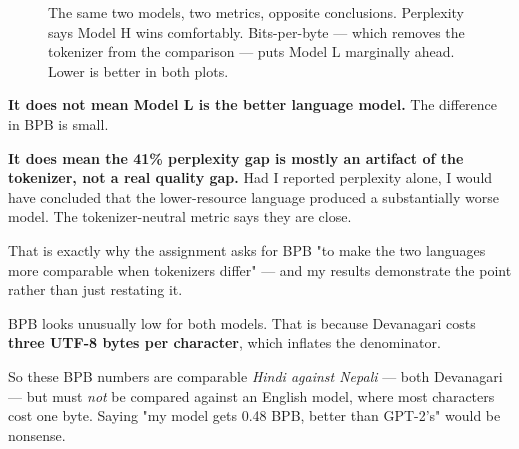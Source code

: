 \documentclass[11pt]{report}
\begin{document}
\begin{figure}[htbp]
\centering
{}
\caption{The same two models, two metrics, opposite conclusions. Perplexity says
Model H wins comfortably. Bits-per-byte --- which removes the tokenizer from the
comparison --- puts Model L marginally ahead. Lower is better in both plots.}
\label{fig:pplbpb}
\end{figure}

\begin{notebox}
\textbf{It does not mean Model L is the better language model.} The difference in
BPB is small.

\textbf{It does mean the 41\% perplexity gap is mostly an artifact of the
tokenizer, not a real quality gap.} Had I reported perplexity alone, I would have
concluded that the lower-resource language produced a substantially worse model.
The tokenizer-neutral metric says they are close.

That is exactly why the assignment asks for BPB "to make the two languages more
comparable when tokenizers differ" --- and my results demonstrate the point
rather than just restating it.
\end{notebox}

\begin{warnbox}
BPB looks unusually low for both models. That is because Devanagari costs
\textbf{three UTF-8 bytes per character}, which inflates the denominator.

So these BPB numbers are comparable \emph{Hindi against Nepali} --- both
Devanagari --- but must \emph{not} be compared against an English model, where
most characters cost one byte. Saying "my model gets 0.48 BPB, better than
GPT-2's" would be nonsense.
\end{warnbox}
\end{document}
